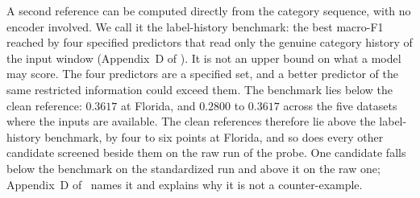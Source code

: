 A second reference can be computed directly from the category sequence, with no encoder involved. We call it the label-history benchmark: the best macro-F1 reached by four specified predictors that read only the genuine category history of the input window (Appendix~D of \extravolume). It is not an upper bound on what a model may score. The four predictors are a specified set, and a better predictor of the same restricted information could exceed them. The benchmark lies below the clean reference: $0.3617$ at Florida, and $0.2800$ to $0.3617$ across the five datasets where the inputs are available. The clean references therefore lie above the label-history benchmark, by four to six points at Florida, and so does every other candidate screened beside them on the raw run of the probe. One candidate falls below the benchmark on the standardized run and above it on the raw one; Appendix~D of \extravolume\ names it and explains why it is not a counter-example.

